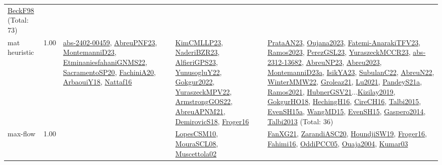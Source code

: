 {\begin{longtable}{p{3cm}r>{\raggedright\arraybackslash}p{6cm}>{\raggedright\arraybackslash}p{6cm}>{\raggedright\arraybackslash}p{8cm}}
\hyperref[detail:BeckF98]{BeckF98} (Total: 73)\\
\index{mat heuristic}\index{Algorithms!mat heuristic}mat heuristic &  1.00 & \hyperref[detail:abs-2402-00459]{abs-2402-00459}, \hyperref[detail:AbreuPNF23]{AbreuPNF23}, \hyperref[detail:MontemanniD23]{MontemanniD23}, \hyperref[detail:EtminaniesfahaniGNMS22]{EtminaniesfahaniGNMS22}, \hyperref[detail:SacramentoSP20]{SacramentoSP20}, \hyperref[detail:FachiniA20]{FachiniA20}, \hyperref[detail:ArbaouiY18]{ArbaouiY18}, \hyperref[detail:Nattaf16]{Nattaf16} & \hyperref[detail:KimCMLLP23]{KimCMLLP23}, \hyperref[detail:NaderiBZR23]{NaderiBZR23}, \hyperref[detail:AlfieriGPS23]{AlfieriGPS23}, \hyperref[detail:YunusogluY22]{YunusogluY22}, \hyperref[detail:Gokgur2022]{Gokgur2022}, \hyperref[detail:YuraszeckMPV22]{YuraszeckMPV22}, \hyperref[detail:ArmstrongGOS22]{ArmstrongGOS22}, \hyperref[detail:AbreuAPNM21]{AbreuAPNM21}, \hyperref[detail:DemirovicS18]{DemirovicS18}, \hyperref[detail:Froger16]{Froger16} & \hyperref[detail:PrataAN23]{PrataAN23}, \hyperref[detail:Oujana2023]{Oujana2023}, \hyperref[detail:Fatemi-AnarakiTFV23]{Fatemi-AnarakiTFV23}, \hyperref[detail:Ramos2023]{Ramos2023}, \hyperref[detail:PerezGSL23]{PerezGSL23}, \hyperref[detail:YuraszeckMCCR23]{YuraszeckMCCR23}, \hyperref[detail:abs-2312-13682]{abs-2312-13682}, \hyperref[detail:AbreuNP23]{AbreuNP23}, \hyperref[detail:Abreu2023]{Abreu2023}, \hyperref[detail:MontemanniD23a]{MontemanniD23a}, \hyperref[detail:IsikYA23]{IsikYA23}, \hyperref[detail:SubulanC22]{SubulanC22}, \hyperref[detail:AbreuN22]{AbreuN22}, \hyperref[detail:WinterMMW22]{WinterMMW22}, \hyperref[detail:Groleaz21]{Groleaz21}, \hyperref[detail:Lu2021]{Lu2021}, \hyperref[detail:PandeyS21a]{PandeyS21a}, \hyperref[detail:Ramos2021]{Ramos2021}, \hyperref[detail:HubnerGSV21]{HubnerGSV21}...\hyperref[detail:Kizilay2019]{Kizilay2019}, \hyperref[detail:GokgurHO18]{GokgurHO18}, \hyperref[detail:HechingH16]{HechingH16}, \hyperref[detail:CireCH16]{CireCH16}, \hyperref[detail:Talbi2015]{Talbi2015}, \hyperref[detail:EvenSH15a]{EvenSH15a}, \hyperref[detail:WangMD15]{WangMD15}, \hyperref[detail:EvenSH15]{EvenSH15}, \hyperref[detail:Gaspero2014]{Gaspero2014}, \hyperref[detail:Talbi2013]{Talbi2013} (Total: 36)\\
\index{max-flow}\index{Algorithms!max-flow}max-flow &  1.00 &  & \hyperref[detail:LopesCSM10]{LopesCSM10}, \hyperref[detail:MouraSCL08]{MouraSCL08}, \hyperref[detail:Muscettola02]{Muscettola02} & \hyperref[detail:FanXG21]{FanXG21}, \hyperref[detail:ZarandiASC20]{ZarandiASC20}, \hyperref[detail:HoundjiSW19]{HoundjiSW19}, \hyperref[detail:Froger16]{Froger16}, \hyperref[detail:Fahimi16]{Fahimi16}, \hyperref[detail:OddiPCC05]{OddiPCC05}, \hyperref[detail:Ouaja2004]{Ouaja2004}, \hyperref[detail:Kumar03]{Kumar03}\\

\end{longtable}}
